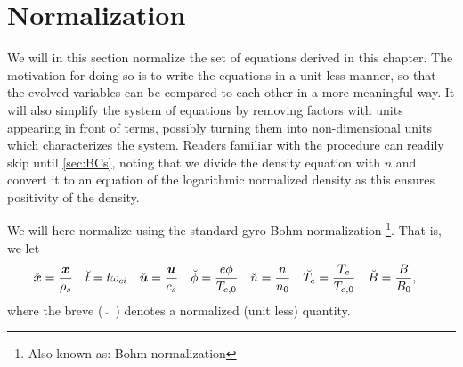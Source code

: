 \section{Normalization}
\label{sec:norm}
We will in this section normalize the set of equations derived in this chapter.
The motivation for doing so is to write the equations in a unit-less manner, so that the evolved variables can be compared to each other in a more meaningful way.
It will also simplify the system of equations by removing factors with units appearing in front of terms, possibly turning them into non-dimensional units which characterizes the system.
Readers familiar with the procedure can readily skip until \cref{sec:BCs}, noting that we divide the density equation with $n$ and convert it to an equation of the logarithmic normalized density as this ensures positivity of the density.

We will here normalize using the standard gyro-Bohm normalization%
%
\footnote{Also known as: Bohm normalization}.%
%
That is, we let
%
\begin{align*}
    &\breve{\boldsymbol{x}} = \frac{\boldsymbol{x}}{\rho_s}&
    &\breve{t}      = t\omega_{ci}&
    &\breve{\boldsymbol{u}} = \frac{\boldsymbol{u}}{c_s}&
    &\breve{\phi}   = \frac{e\phi}{T_{e,0}}&
    &\breve{n}      = \frac{n}{n_{0}}&
    &\breve{T_e}    = \frac{T_e}{T_{e,0}}&
    &\breve{B}      = \frac{B}{B_0},&
\end{align*}
%
where the breve ($\breve{\quad}$) denotes a normalized (unit less) quantity.

